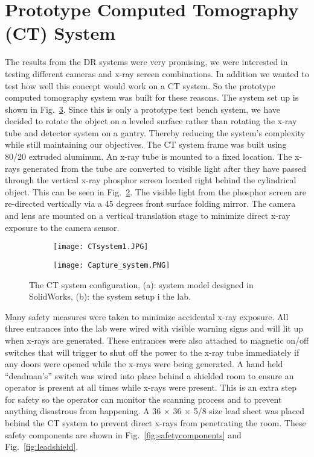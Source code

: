 \section{Prototype Computed Tomography (CT) System}
The results from the DR systems were very promising, we were interested in testing different cameras and x-ray screen combinations.  In addition we wanted to test how well this concept would work on a CT system.  So the prototype computed tomography system was built for these reasons.  The system set up is shown in Fig.~\ref{fig:CTsystem}.  Since this is only a prototype test bench system, we have decided to rotate the object on a leveled surface rather than rotating the x-ray tube and detector system on a gantry.  Thereby reducing the system's complexity while still maintaining our objectives.  The CT system frame was built using 80/20 extruded aluminum.  An x-ray tube is mounted to a fixed location.  The x-rays generated from the tube are converted to visible light after they have passed through the vertical x-ray phosphor screen located right behind the cylindrical object.  This can be seen in Fig.~\ref{fig:CTlab}.  The visible light from the phosphor screen are re-directed vertically via a 45 degrees front surface folding mirror.  The camera and lens are mounted on a vertical translation stage to minimize direct x-ray exposure to the camera sensor.

\begin{figure}[h]
	\begin{subfigure}[b]{0.45\linewidth}
	\centering
	\texttt{[image: CTsystem1.JPG]}
	\caption{}
	\label{fig:CTmodel}
	\end{subfigure}
\hspace{1 cm}
	\begin{subfigure}[b]{0.45\linewidth}
	\centering
	\texttt{[image: Capture\_system.PNG]}
	\caption{}
	\label{fig:CTlab}
	\end{subfigure}
\caption{The CT system configuration, (a): system model designed in SolidWorks, (b): the system setup i the lab.}
\label{fig:CTsystem}
\end{figure}

Many safety measures were taken to minimize accidental x-ray exposure.  All three entrances into the lab were wired with visible warning signs and will lit up when x-rays are generated.  These entrances were also attached to magnetic on/off switches that will trigger to shut off the power to the x-ray tube immediately if any doors were opened while the x-rays were being generated.  A hand held ``deadman's'' switch was wired into place behind a shielded room to ensure an operator is present at all times while x-rays were present.  This is an extra step for safety so the operator can monitor the scanning process and to prevent anything disastrous from happening.  A 36 \inches $\times$ 36 \inches $\times$ 5/8 \inches size lead sheet was placed behind the CT system to prevent direct x-rays from penetrating the room.  These safety components are shown in Fig.~\ref{fig:safetycomponents} and Fig.~\ref{fig:leadshield}.

